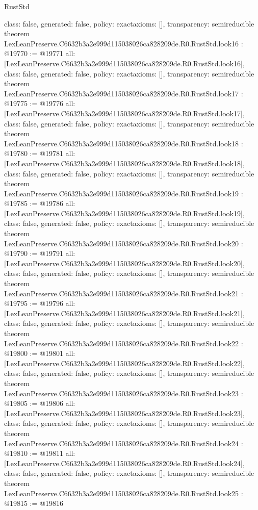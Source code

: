 \begin{lexlean}{RustStd}
\begin{coremodule}
{  class: false,
  generated: false,
  policy: exact{axioms: []},
  transparency: semireducible
}
theorem LexLeanPreserve.C6632b3a2e999d115038026ca828209de.R0.RustStd.look16 : @19770 := @19771 {
  all: [LexLeanPreserve.C6632b3a2e999d115038026ca828209de.R0.RustStd.look16],
  class: false,
  generated: false,
  policy: exact{axioms: []},
  transparency: semireducible
}
theorem LexLeanPreserve.C6632b3a2e999d115038026ca828209de.R0.RustStd.look17 : @19775 := @19776 {
  all: [LexLeanPreserve.C6632b3a2e999d115038026ca828209de.R0.RustStd.look17],
  class: false,
  generated: false,
  policy: exact{axioms: []},
  transparency: semireducible
}
theorem LexLeanPreserve.C6632b3a2e999d115038026ca828209de.R0.RustStd.look18 : @19780 := @19781 {
  all: [LexLeanPreserve.C6632b3a2e999d115038026ca828209de.R0.RustStd.look18],
  class: false,
  generated: false,
  policy: exact{axioms: []},
  transparency: semireducible
}
theorem LexLeanPreserve.C6632b3a2e999d115038026ca828209de.R0.RustStd.look19 : @19785 := @19786 {
  all: [LexLeanPreserve.C6632b3a2e999d115038026ca828209de.R0.RustStd.look19],
  class: false,
  generated: false,
  policy: exact{axioms: []},
  transparency: semireducible
}
theorem LexLeanPreserve.C6632b3a2e999d115038026ca828209de.R0.RustStd.look20 : @19790 := @19791 {
  all: [LexLeanPreserve.C6632b3a2e999d115038026ca828209de.R0.RustStd.look20],
  class: false,
  generated: false,
  policy: exact{axioms: []},
  transparency: semireducible
}
theorem LexLeanPreserve.C6632b3a2e999d115038026ca828209de.R0.RustStd.look21 : @19795 := @19796 {
  all: [LexLeanPreserve.C6632b3a2e999d115038026ca828209de.R0.RustStd.look21],
  class: false,
  generated: false,
  policy: exact{axioms: []},
  transparency: semireducible
}
theorem LexLeanPreserve.C6632b3a2e999d115038026ca828209de.R0.RustStd.look22 : @19800 := @19801 {
  all: [LexLeanPreserve.C6632b3a2e999d115038026ca828209de.R0.RustStd.look22],
  class: false,
  generated: false,
  policy: exact{axioms: []},
  transparency: semireducible
}
theorem LexLeanPreserve.C6632b3a2e999d115038026ca828209de.R0.RustStd.look23 : @19805 := @19806 {
  all: [LexLeanPreserve.C6632b3a2e999d115038026ca828209de.R0.RustStd.look23],
  class: false,
  generated: false,
  policy: exact{axioms: []},
  transparency: semireducible
}
theorem LexLeanPreserve.C6632b3a2e999d115038026ca828209de.R0.RustStd.look24 : @19810 := @19811 {
  all: [LexLeanPreserve.C6632b3a2e999d115038026ca828209de.R0.RustStd.look24],
  class: false,
  generated: false,
  policy: exact{axioms: []},
  transparency: semireducible
}
theorem LexLeanPreserve.C6632b3a2e999d115038026ca828209de.R0.RustStd.look25 : @19815 := @19816 {
}
\end{coremodule}
\end{lexlean}
